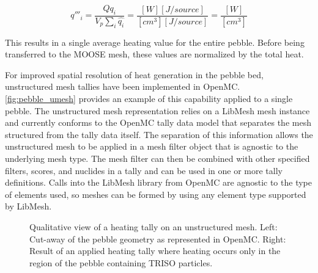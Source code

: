 \begin{equation}
    \label{eq:heat_source_normalization}
    q'''_i = \frac{Q q_i}{V_{p}\sum_{i}{\hat{q_i}}} = \frac{[W][J/source]}{[cm^{3}] [J/source]} = \frac{[W]}{[cm^{3}]}
\end{equation}

This results in a single average heating value for the entire pebble. Before being transferred to the MOOSE mesh, these values are normalized by the total heat.

For improved spatial resolution of heat generation in the pebble bed, unstructured mesh tallies have been implemented in OpenMC. \autoref{fig:pebble_umesh} provides an example of this capability applied to a single pebble. The unstructured mesh representation relies on a LibMesh mesh instance and currently conforms to the OpenMC tally data model that separates the mesh structured from the tally data itself. The separation of this information allows the unstructured mesh to be applied in a mesh filter object that is agnostic to the underlying mesh type. The mesh filter can then be combined with other specified filters, scores, and nuclides in a tally and can be used in one or more tally definitions. Calls into the LibMesh library from OpenMC are agnostic to the type of elements used, so meshes can be formed by using any element type supported by LibMesh.

\begin{figure}
    \centering
    \hspace*{.2in}
    \caption{Qualitative view of a heating tally on an unstructured mesh. Left: Cut-away of the pebble geometry as represented in OpenMC. Right: Result of an applied heating tally where heating occurs only in the region of the pebble containing TRISO particles.}
    \label{fig:pebble_umesh}
\end{figure}

